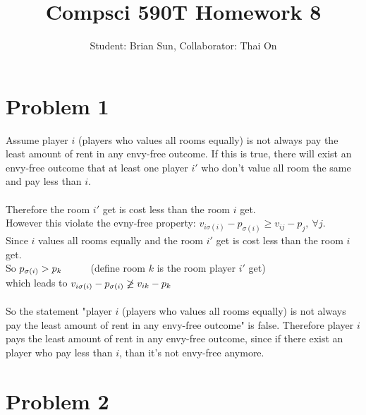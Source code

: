 \documentclass{article}
\title{Compsci 590T Homework 8}
\author{Student: Brian Sun, Collaborator: Thai On}
\date{}
\newcommand\tab[1][1cm]{\hspace*{#1}}
\begin{document}
\maketitle


\section{Problem 1}
Assume player $i$ (players who values all rooms equally) is not always pay the least amount of rent in any envy-free outcome. If this is true, there will exist an envy-free outcome that at least one player $i'$ who don't value all room the same and pay less than $i$.\\\\
Therefore the room $i'$ get is cost less than the room $i$ get.\\
However this violate the evny-free property: $v_{i\sigma(i)} - p_{\sigma(i)} \geq v_{ij} - p_j,\ \forall j$.\\
Since $i$ values all rooms equally and the room $i'$ get is cost less than the room $i$ get. \\
So $p_{\sigma(i)} > p_k \tab$(define room $k$ is the room player $i'$ get)\\
which leads to $v_{i\sigma(i)} - p_{\sigma(i)} \not\geq v_{ik} - p_k \tab$\\\\
So the statement "player $i$ (players who values all rooms equally) is not always pay the least amount of rent in any envy-free outcome" is false. Therefore player $i$ pays the least amount of rent in any envy-free outcome, since if there exist an player who pay less than $i$, than it's not envy-free anymore.

\newpage
\section{Problem 2}
\end{document}
